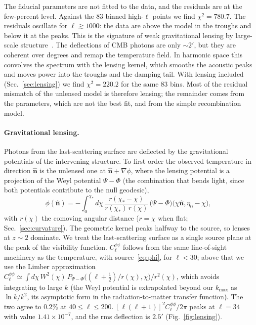 The fiducial parameters are not fitted to the data, and the residuals are at the few-percent level. Against the 83
binned high-$\ell$ points we find $\chi^2=780.7$. The residuals oscillate for $\ell\gtrsim1000$: the data are above
the model in the troughs and below it at the peaks. This is the signature of weak gravitational lensing by
large-scale structure~\cite{Lewis2006}. The deflections of CMB photons are only $\sim2'$, but they are coherent over
degrees and remap the temperature field. In harmonic space this convolves the spectrum with the lensing kernel, which
smooths the acoustic peaks and moves power into the troughs and the damping tail. With lensing included
(Sec.~\ref{sec:lensing}) we find $\chi^2=220.2$ for the same 83 bins. Most of the residual mismatch of the unlensed
model is therefore lensing; the remainder comes from the parameters, which are not the best fit, and from the
simple recombination model.

\paragraph*{Gravitational lensing.}\label{sec:lensing}
Photons from the last-scattering surface are deflected by the gravitational potentials of the intervening structure.
To first order the observed temperature in direction $\hat{\mathbf n}$ is the unlensed one at
$\hat{\mathbf n}+\nabla\phi$, where the lensing potential is a projection of the Weyl potential $\Psi-\Phi$ (the
combination that bends light, since both potentials contribute to the null geodesic),
\begin{equation}
\phi(\hat{\mathbf n})=-\int_0^{\chi_*}\!d\chi\,\frac{r(\chi_*-\chi)}{r(\chi_*)\,r(\chi)}\,
\bigl(\Psi-\Phi\bigr)\bigl(\chi\hat{\mathbf n},\eta_0-\chi\bigr),
\label{eq:phi}
\end{equation}
with $r(\chi)$ the comoving angular distance ($r=\chi$ when flat; Sec.~\ref{sec:curvature}). The geometric kernel
peaks halfway to the source, so lenses at $z\sim2$ dominate. We treat the last-scattering surface as a single source
plane at the peak of the visibility function. $C_\ell^{\phi\phi}$ follows from the same line-of-sight machinery as
the temperature, with source~\eqref{eq:phi}, for $\ell<30$; above that we use the Limber approximation
$C_\ell^{\phi\phi}\simeq\int d\chi\,W^2(\chi)\,P_{\Psi-\Phi}\bigl((\ell+\tfrac12)/r(\chi),\chi\bigr)/r^2(\chi)$, which
avoids integrating to large $k$ (the Weyl potential is extrapolated beyond our $k_{\max}$ as $\ln k/k^2$, its
asymptotic form in the radiation-to-matter transfer function). The two agree to $0.2\%$ at $40\le\ell\le200$.
$[\ell(\ell+1)]^2C_\ell^{\phi\phi}/2\pi$ peaks at $\ell=34$ with value
$1.41\times10^{-7}$, and the rms deflection is $2.5'$ (Fig.~\ref{fig:lensing}).

